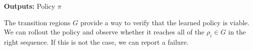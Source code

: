 \noindent\textbf{Outputs:} Policy $\pi$

The transition regions $G$ provide a way to verify that the learned policy is viable.
We can rollout the policy and observe whether it reaches all of the $\rho_i \in G$ in the right sequence.
If this is not the case, we can report a failure.








